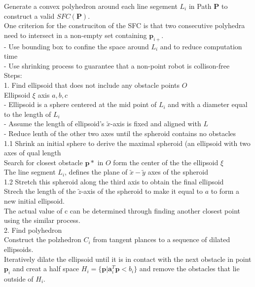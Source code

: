 Generate a convex polyhedron around each line segement $L_i$ in Path $\mathbf{P}$ to construct a valid $SFC(\mathbf{P})$.\\

One criterion for the construciton of the SFC is that two consecutive polyhedra need to intersect in a non-empty set containing $\mathbf{p}_{i+}$.\\

- Use bounding box to confine the space around $L_i$ and to reduce computation time\\
- Use shrinking process to guarantee that a non-point robot is collison-free\\

Steps:\\
1. Find ellipsoid that does not include any obstacle points $O$\\
Ellipsoid $\xi$ axis $a,b,c$\\
- Ellipsoid is a sphere centered at the mid point of $L_i$ and with a diameter equal to the length of $L_i$\\
- Assume the length of ellipsoid's $\tilde{x}$-axis is fixed and aligned with $L$\\
- Reduce lenth of the other two axes until the spheroid contains no obstacles\\

1.1 Shrink an initial sphere to derive the maximal spheroid (an ellipsoid with two axes of qual length\\
Search for closest obstacle $\mathbf{p}*$ in $O$ form the center of the the ellipsoid $\xi$\\
The line segment $L_i$, defines the plane of $\tilde{x}-\tilde{y}$ axes of the spheroid\\

1.2 Stretch this spheroid along the third axis to obtain the final ellipsoid\\
Strech the length of the $\tilde{z}$-axis of the spheroid to make it equal to $a$ to form a new initial ellipsoid.\\

The actual value of c can be determined through finding another closest point using the similar process.\\
 
2. Find polyhedron\\
Construct the polzhedron $C_i$ from tangent plances to a sequence of dilated ellipsoids.\\

Iteratively dilate the ellipsoid until it is in contact with the next obstacle in point $\mathbf{p}_i$ and creat a half space $H_i = \lbrace \mathbf{p} \rvert \mathbf{a}_i^T\mathbf{p} < b_i \rbrace$ and remove the obstacles that lie outside of $H_i$.\\

